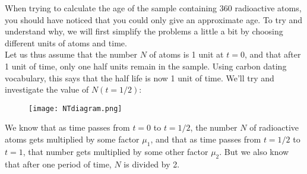  \vspace{0.2cm}

When trying to calculate the age of the sample containing 360 radioactive atoms, you should have noticed that you could only give an approximate age. To try and understand why, we will first simplify the problems a little a bit by choosing different units of atoms and time. \\

Let us thus assume that the number $N$ of atoms is 1 unit at $t=0$, and that after 1 unit of time, only one half units remain in the sample. Using carbon dating vocabulary, this says that the half life is now 1 unit of time. We'll try and investigate the value of $N(t =1/2)$: \\

\begin{figure}[H]
   \centering
   \texttt{[image: NTdiagram.png]} 
\end{figure}

We know that as time passes from $t=0$ to $t=1/2$, the number $N$ of radioactive atoms gets multiplied by some factor $\mu_1$, and that as time passes from $t =1/2$ to $t=1$, that number gets multiplied by some other factor $\mu_2$. But we also know that after one period of time, $N$ is divided by 2. \\

